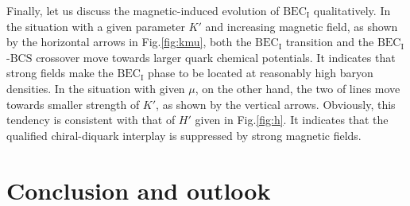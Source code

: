 \documentclass[prd, showpacs,nofootinbib,amsmath,amssymb,12pt]{revtex4}
\begin{document}
Finally, let us discuss the magnetic-induced evolution of $\text{BEC}_\text{I}$ qualitatively.
In the situation with a given parameter $K'$ and increasing magnetic field, as shown by the horizontal arrows in Fig.\ref{fig:kmu},
both the $\text{BEC}_\text{I}$ transition and the $\text{BEC}_\text{I}$-$\text{BCS}$ crossover move towards 
larger quark chemical potentials.
It indicates that strong fields make the $\text{BEC}_\text{I}$ phase to be located at reasonably high baryon densities.
In the situation with given $\mu$, on the other hand, the two of lines move towards smaller strength of $K'$, as shown by the vertical arrows. Obviously, this tendency is consistent with that of $H'$ given in Fig.\ref{fig:h}. It indicates that the qualified chiral-diquark interplay is suppressed by strong magnetic fields.



\section{Conclusion and outlook}
\label{sec:4}
\end{document}
